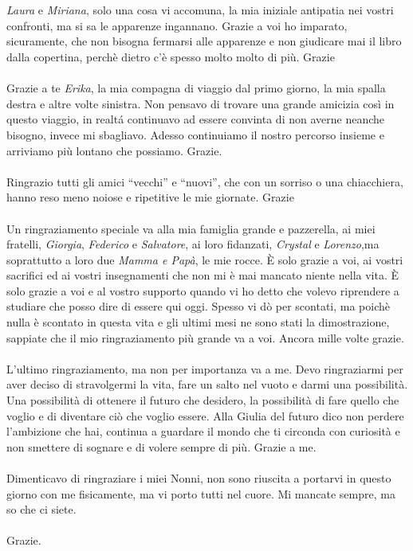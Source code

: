 \\
\\
\textit{Laura} e \textit{Miriana}, solo una cosa vi accomuna, la mia iniziale antipatia nei vostri confronti, ma si sa le apparenze ingannano.
Grazie a voi ho imparato, sicuramente, che non bisogna fermarsi alle apparenze e non giudicare mai il libro dalla copertina, perch\`e dietro c'\`e spesso molto molto di pi\`u. Grazie
\\
\\
Grazie a te \textit{Erika}, la mia compagna di viaggio dal primo giorno, la mia spalla destra e altre volte sinistra.
Non pensavo di trovare una grande amicizia cos\`i in questo viaggio, in realt\'a continuavo ad essere convinta di non averne neanche bisogno, invece mi sbagliavo.
Adesso continuiamo il nostro percorso insieme e arriviamo pi\`u lontano che possiamo. Grazie.
\\
\\
Ringrazio tutti gli amici ``vecchi'' e ``nuovi'', che con un sorriso o una chiacchiera, hanno reso meno noiose e ripetitive le mie giornate.
Grazie
\\
\\
Un ringraziamento speciale va alla mia famiglia grande e pazzerella, ai miei fratelli, \textit{Giorgia}, \textit{Federico} e \textit{Salvatore}, ai loro fidanzati, \textit{Crystal} e \textit{Lorenzo},ma soprattutto a loro due \textit{Mamma e Pap\`a}, le mie rocce.
\`E solo grazie a voi, ai vostri sacrifici ed ai vostri insegnamenti che non mi \`e mai mancato niente nella vita.
\`E solo grazie a voi e al vostro supporto quando vi ho detto che volevo riprendere a studiare che posso dire di essere qui oggi.
Spesso vi d\`o per scontati, ma poich\`e nulla \`e scontato in questa vita e gli ultimi mesi ne sono stati la dimostrazione, sappiate che il mio ringraziamento pi\`u grande va a voi. Ancora mille volte grazie.
\\
\\
L'ultimo ringraziamento, ma non per importanza va a me.
Devo ringraziarmi per aver deciso di stravolgermi la vita, fare un salto nel vuoto e darmi una possibilit\`a.
Una possibilit\`a di ottenere il futuro che desidero, la possibilit\`a di fare quello che voglio e di diventare ci\`o che voglio essere.
Alla Giulia del futuro dico non perdere l'ambizione che hai, continua a guardare il mondo che ti circonda con curiosit\`a e non smettere di sognare e di volere sempre di pi\`u. Grazie a me.
\\
\\
Dimenticavo di ringraziare i miei Nonni, non sono riuscita a portarvi in questo giorno con me fisicamente, ma vi porto tutti nel cuore. Mi mancate sempre, ma so che ci siete. 
\\  
\\
Grazie.